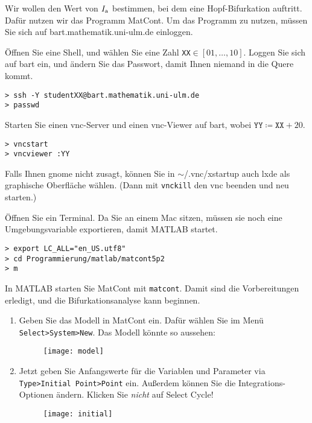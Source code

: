 \documentclass[11pt,a4paper]{article}
\begin{document}
\begin{aufg}
Wir wollen den Wert von $I_{\rm a}$ bestimmen, bei dem eine Hopf-Bifurkation
auftritt. Dafür nutzen wir das Programm MatCont. Um das Programm zu nutzen,
müssen Sie sich auf bart.mathematik.uni-ulm.de einloggen.

Öffnen Sie eine Shell, und wählen Sie eine Zahl \texttt{XX}$\in[01,\dots,10]$.
Loggen Sie sich auf bart ein, und ändern Sie das Passwort, damit Ihnen niemand
in die Quere kommt.

\begin{verbatim}
> ssh -Y studentXX@bart.mathematik.uni-ulm.de
> passwd
\end{verbatim}

Starten Sie einen vnc-Server und einen vnc-Viewer auf bart, wobei
 $\texttt{YY} \coloneqq \texttt{XX} + 20$.

\begin{verbatim}
> vncstart
> vncviewer :YY
\end{verbatim}

Falls Ihnen gnome nicht zusagt, können Sie in
$\sim$/.vnc/xstartup
auch lxde als graphische Oberfläche wählen. (Dann mit \texttt{vnckill} den vnc
beenden und neu starten.)

Öffnen Sie ein Terminal. Da Sie an einem Mac sitzen, müssen sie noch eine
Umgebungsvariable exportieren, damit MATLAB startet.

\begin{verbatim}
> export LC_ALL="en_US.utf8"
> cd Programmierung/matlab/matcont5p2
> m
\end{verbatim}
In MATLAB starten Sie MatCont mit \texttt{matcont}. Damit sind die
Vorbereitungen erledigt, und die Bifurkationsanalyse kann beginnen.
\pagebreak
\begin{enumerate}

\item Geben Sie das Modell in MatCont ein. Dafür wählen Sie im Men\"u
\texttt{Select>System>New}. Das Modell könnte so aussehen:
\begin{figure}[h!]
 \centering
 \texttt{[image: model]}
\end{figure}

\item Jetzt geben Sie Anfangswerte für die Variablen und Parameter
via \texttt{Type>Initial Point>Point} ein. Au{\ss}erdem k\"onnen Sie die
Integrations-Optionen \"andern. Klicken Sie \emph{nicht} auf
Select Cycle!
\begin{figure}[h!]
 \centering
 \texttt{[image: initial]}
\end{figure}



\end{enumerate}
\end{aufg}
\end{document}
